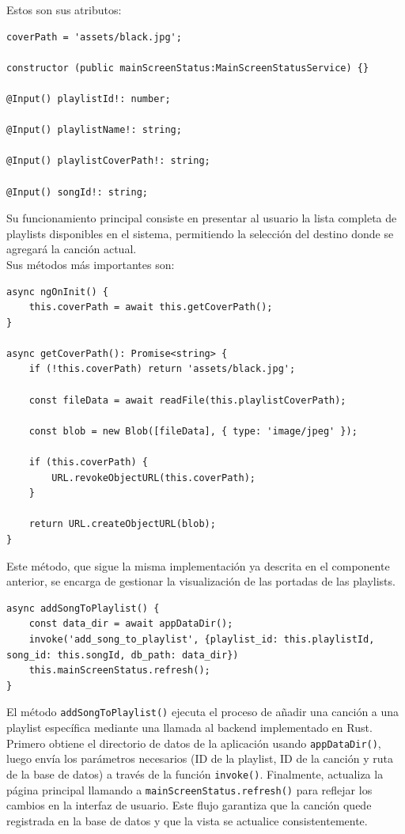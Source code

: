 \documentclass[11pt, a4paper]{article}
\begin{document}
                Estos son sus atributos:

                \begin{lstlisting}[caption={Atributos Playlist Button}]
coverPath = 'assets/black.jpg';

constructor (public mainScreenStatus:MainScreenStatusService) {}

@Input() playlistId!: number;

@Input() playlistName!: string;

@Input() playlistCoverPath!: string;

@Input() songId!: string;
                \end{lstlisting}

                Su funcionamiento principal consiste en presentar al usuario la lista completa de playlists disponibles en el sistema, permitiendo la selección del destino donde se agregará la canción actual. \\

                Sus métodos más importantes son:

                \begin{lstlisting}[caption={getCoverPath()}]
async ngOnInit() {
    this.coverPath = await this.getCoverPath();
}

async getCoverPath(): Promise<string> {
    if (!this.coverPath) return 'assets/black.jpg';

    const fileData = await readFile(this.playlistCoverPath);

    const blob = new Blob([fileData], { type: 'image/jpeg' });

    if (this.coverPath) {
        URL.revokeObjectURL(this.coverPath);
    }

    return URL.createObjectURL(blob);
}
                \end{lstlisting}

                Este método, que sigue la misma implementación ya descrita en el componente anterior, se encarga de gestionar la visualización de las portadas de las playlists.

                \begin{lstlisting}[caption={addSongToPlaylist()}]
async addSongToPlaylist() {
    const data_dir = await appDataDir();
    invoke('add_song_to_playlist', {playlist_id: this.playlistId, song_id: this.songId, db_path: data_dir})
    this.mainScreenStatus.refresh();
}
                \end{lstlisting}

                El método \verb|addSongToPlaylist()| ejecuta el proceso de añadir una canción a una playlist específica mediante una llamada al backend implementado en Rust. Primero obtiene el directorio de datos de la aplicación usando \verb|appDataDir()|, luego envía los parámetros necesarios (ID de la playlist, ID de la canción y ruta de la base de datos) a través de la función \verb|invoke()|. Finalmente, actualiza la página principal llamando a \verb|mainScreenStatus.refresh()| para reflejar los cambios en la interfaz de usuario. Este flujo garantiza que la canción quede registrada en la base de datos y que la vista se actualice consistentemente.
\end{document}
